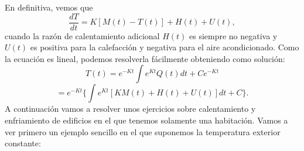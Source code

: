 En definitiva, vemos que 
\begin{equation}
	\dfrac{d T}{d t} = K[M(t) - T(t)] + H(t) + U(t),
\end{equation}
cuando la razón de calentamiento adicional $H(t)$ es siempre no negativa y $U(t)$ es positiva para la calefacción y negativa para el aire acondicionado. Como la ecuación es lineal, podemos resolverla fácilmente obteniendo como solución:
\begin{equation}\label{eq:apli2}
	T(t) = e^{-Kt}\int e^{Kt}Q(t)dt + Ce^{-Kt}
\end{equation}
\begin{equation}
	= e^{-Kt}\{\int e^{Kt}[KM(t) + H(t) + U(t)]dt + C\}.
\end{equation}
A continuación vamos a resolver unos ejercicios sobre calentamiento y enfriamiento de edificios en el que tenemos solamente una habitación. Vamos a ver primero un ejemplo sencillo en el que suponemos la temperatura exterior constante:
